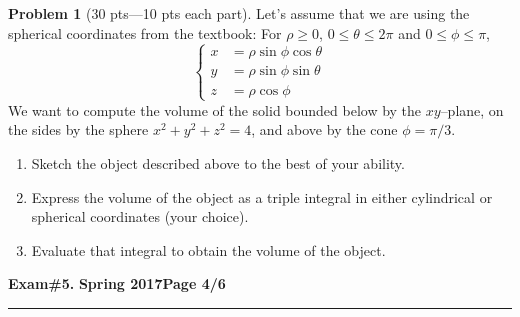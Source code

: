 \documentclass[12pt]{article}
\theoremstyle{definition}
\newtheorem{problem}{Problem}
\begin{document}
\bigskip
\begin{problem}[30 pts---10 pts each part]
Let's assume that we are using the spherical coordinates from the textbook: For $\rho \geq 0$, $0 \leq \theta \leq 2\pi$ and $0\leq \phi \leq \pi$,
\begin{equation*}
\begin{cases}
x &= \rho \sin\phi \cos\theta \\
y &= \rho \sin\phi \sin\theta \\
z &= \rho \cos\phi
\end{cases}
\end{equation*}
We want to compute the volume of the solid bounded below by the $xy$--plane, on the sides by the sphere $x^2+y^2+z^2=4$, and above by the cone $\phi=\pi/3$. 
\begin{enumerate}
\item Sketch the object described above to the best of your ability.
\vspace{4cm}
\item Express the volume of the object as a triple integral in either cylindrical or spherical coordinates (your choice).
\vspace{4cm}
\begin{flushright}
\end{flushright}
\item Evaluate that integral to obtain the volume of the object.
\vspace{4cm}
\begin{flushright}
\end{flushright}
\end{enumerate}
\end{problem}

\newpage

\hfill{\large\bf Exam\#5.}\hfill{\large\bf
  Spring 2017}\hfill{\large\bf Page 4/6}\hrule
\end{document}
